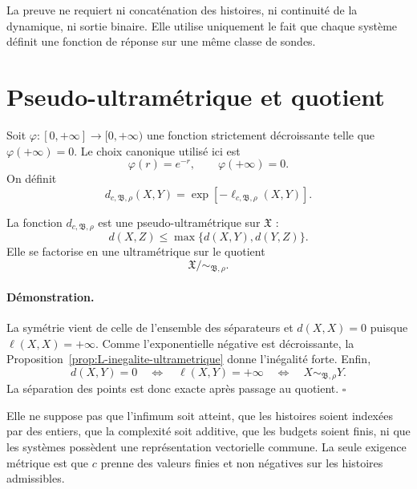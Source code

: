 La preuve ne requiert ni concaténation des histoires, ni continuité de la
dynamique, ni sortie binaire. Elle utilise uniquement le fait que chaque
système définit une fonction de réponse sur une même classe de sondes.

\section{Pseudo-ultramétrique et quotient}
\label{annexe-L-distance}

Soit
\(
\varphi:[0,+\infty]\to[0,+\infty)
\)
une fonction strictement décroissante telle que
\(
\varphi(+\infty)=0
\).
Le choix canonique utilisé ici est
\[
\varphi(r)=e^{-r},
\qquad
\varphi(+\infty)=0.
\]
On définit
\begin{equation}
\label{eq:annexe-L-distance}
\boxed{
d_{c,\mathfrak B,\rho}(X,Y)
=
\exp\!\left[-\ell_{c,\mathfrak B,\rho}(X,Y)\right].
}
\end{equation}

\begin{encadre}[title={Corollaire \theproposition{} --- Géométrie ultramétrique}]
La fonction \(d_{c,\mathfrak B,\rho}\) est une pseudo-ultramétrique sur
\(\mathfrak X\) :
\[
d(X,Z)
\leq
\max\{d(X,Y),d(Y,Z)\}.
\]
Elle se factorise en une ultramétrique sur le quotient
\[
\mathfrak X/\!\sim_{\mathfrak B,\rho}.
\]
\end{encadre}

\paragraph{Démonstration.}
La symétrie vient de celle de l'ensemble des séparateurs et
\(d(X,X)=0\) puisque \(\ell(X,X)=+\infty\). Comme l'exponentielle
négative est décroissante, la Proposition~\ref{prop:L-inegalite-ultrametrique} donne l'inégalité forte.
Enfin,
\[
d(X,Y)=0
\quad\Longleftrightarrow\quad
\ell(X,Y)=+\infty
\quad\Longleftrightarrow\quad
X\sim_{\mathfrak B,\rho}Y.
\]
La séparation des points est donc exacte après passage au quotient.
\hfill\(\square\)

\begin{encadre}[title={Ce que la proposition ne suppose pas}]
Elle ne suppose pas que l'infimum soit atteint, que les histoires soient
indexées par des entiers, que la complexité soit additive, que les
budgets soient finis, ni que les systèmes possèdent une représentation
vectorielle commune. La seule exigence métrique est que \(c\) prenne des
valeurs finies et non négatives sur les histoires admissibles.
\end{encadre}

